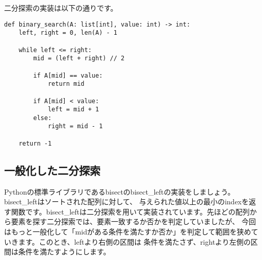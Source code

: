 \begin{center}
\end{center}

二分探索の実装は以下の通りです。

\begin{lstlisting}[caption=二分探索の実装, frame=TRBL, label={simle_binary}]
def binary_search(A: list[int], value: int) -> int:
    left, right = 0, len(A) - 1
    
    while left <= right:
        mid = (left + right) // 2
        
        if A[mid] == value:
            return mid
        
        if A[mid] < value:
            left = mid + 1
        else:
            right = mid - 1
    
    return -1
\end{lstlisting}

\subsection{一般化した二分探索}
Pythonの標準ライブラリであるbisectのbisect\_leftの実装をしましょう。bisect\_leftはソートされた配列に対して、
与えられた値以上の最小のindexを返す関数です。bisect\_leftは二分探索を用いて実装されています。先ほどの配列から要素を探す二分探索では、要素一致するか否かを判定していましたが、
今回はもっと一般化して「midがある条件を満たすか否か」を判定して範囲を狭めていきます。このとき、leftより右側の区間は
条件を満たさず、rightより左側の区間は条件を満たすようにします。 

